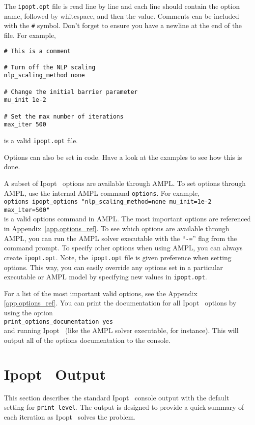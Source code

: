\documentclass[10pt]{article}
\newcommand{\Ipopt}{{\sc Ipopt }}
\begin{document}
The {\tt ipopt.opt} file is read line by line and each line should
contain the option name, followed by whitespace, and then the
value. Comments can be included with the {\tt \#} symbol. Don't forget
to ensure you have a newline at the end of the file. For example,
\begin{verbatim}
# This is a comment

# Turn off the NLP scaling
nlp_scaling_method none

# Change the initial barrier parameter
mu_init 1e-2

# Set the max number of iterations
max_iter 500
\end{verbatim}
is a valid {\tt ipopt.opt} file.

Options can also be set in code. Have a look at the examples to see
how this is done. 

A subset of \Ipopt\ options are available through AMPL. To set options
through AMPL, use the internal AMPL command {\tt options}.  For
example, \\
{\tt options ipopt\_options "nlp\_scaling\_method=none mu\_init=1e-2
  max\_iter=500"} \\
is a valid options command in AMPL. The most important options are
referenced in Appendix~\ref{app.options_ref}. To see which options are
available through AMPL, you can run the AMPL solver executable with
the ``{\tt -=}'' flag from the command prompt.  To specify other
options when using AMPL, you can always create {\tt ipopt.opt}.  Note,
the {\tt ipopt.opt} file is given preference when setting options.
This way, you can easily override any options set in a particular
executable or AMPL model by specifying new values in {\tt ipopt.opt}.

For a list of the most important valid options, see the Appendix
\ref{app.options_ref}. You can print the documentation for all \Ipopt\
options by using the option \\

{\tt print\_options\_documentation yes} \\

and running \Ipopt\ (like the AMPL solver executable, for
instance). This will output all of the options documentation to the
console.

\section{\Ipopt\ Output}\label{sec:output}
This section describes the standard \Ipopt\ console output with the
default setting for {\tt print\_level}. The output is designed to
provide a quick summary of each iteration as \Ipopt\ solves the problem.
\end{document}
